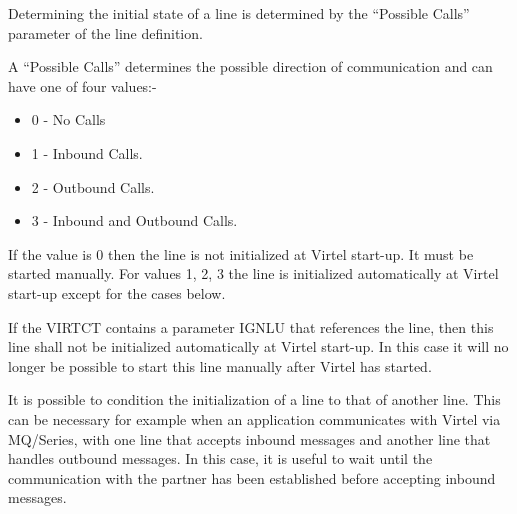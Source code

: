 \documentclass[letterpaper,10pt,english]{sphinxmanual}
\begin{document}
\ignorespaces 
Determining the initial state of a line is determined by the “Possible Calls” parameter of the line definition.




A “Possible Calls” determines the possible direction of communication and can have one of four values:-
\begin{itemize}
\item {} 
0 - No Calls

\item {} 
1 - Inbound Calls.

\item {} 
2 - Outbound Calls.

\item {} 
3 - Inbound and Outbound Calls.

\end{itemize}

If the value is 0 then the line is not initialized at Virtel start-up. It must be started manually. For values 1, 2, 3 the line is initialized automatically at Virtel start-up except for the cases below.


\ignorespaces 
If the VIRTCT contains a parameter IGNLU that references the line, then this line shall not be initialized automatically at Virtel start-up. In this case it will no longer be possible to start this line manually after Virtel has started.

\ignorespaces 
{}

It is possible to condition the initialization of a line to that of another line. This can be necessary for example when an application communicates with Virtel via MQ/Series, with one line that accepts inbound messages and another line that handles outbound messages. In this case, it is useful to wait until the communication with the partner has been
established before accepting inbound messages.
\end{document}
